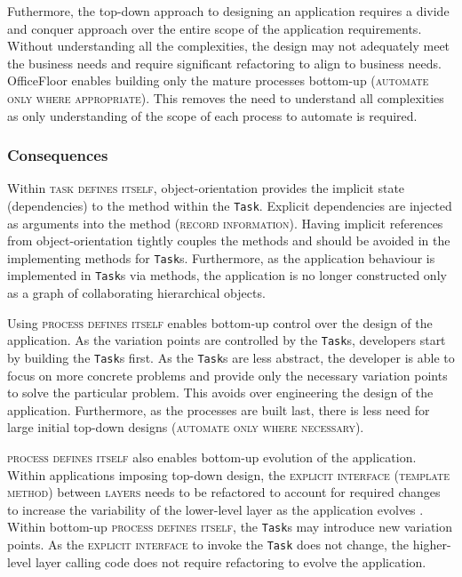\documentclass[prodmode]{style/acmlarge}
\begin{document}
Futhermore, the top-down approach to designing an application requires a divide
and conquer approach over the entire scope of the application requirements.
Without understanding all the complexities, the design may not adequately meet
the business needs and require significant refactoring to align to business
needs.  OfficeFloor enables building only the mature processes bottom-up
(\textsc{automate only where appropriate}).  This removes the need to understand
all complexities as only understanding of the scope of each process to automate
is required.


\subsubsection*{Consequences}

Within \textsc{task defines itself}, object-orientation provides the implicit
state (dependencies) to the method within the \texttt{Task}.  Explicit
dependencies are injected as arguments into the method (\textsc{record
information}).  Having implicit references from object-orientation tightly
couples the methods and should be avoided in the implementing methods for
\texttt{Task}s.  Furthermore, as the application behaviour is implemented in
\texttt{Task}s via methods, the application is no longer constructed only as a
graph of collaborating hierarchical objects.

Using \textsc{process defines itself} enables bottom-up control over the design
of the application.  As the variation points are controlled by the
\texttt{Task}s, developers start by building the \texttt{Task}s first.  As
the \texttt{Task}s are less abstract, the developer is able to focus on more
concrete problems and provide only the necessary variation points to solve the
particular problem.  This avoids over engineering the design of the application.
 Furthermore, as the processes are built last, there is less need for large
initial top-down designs (\textsc{automate only where necessary}).

\textsc{process defines itself} also enables bottom-up evolution of the
application.  Within applications imposing top-down design, the
\textsc{explicit interface} (\textsc{template method}) between \textsc{layers}
needs to be refactored to account for required changes to increase the
variability of the lower-level layer as the application evolves \cite{ioc}.
Within bottom-up \textsc{process defines itself}, the \texttt{Task}s may
introduce new variation points.  As the \textsc{explicit interface} to invoke
the \texttt{Task} does not change, the higher-level layer calling code does not
require refactoring to evolve the application.
\end{document}
